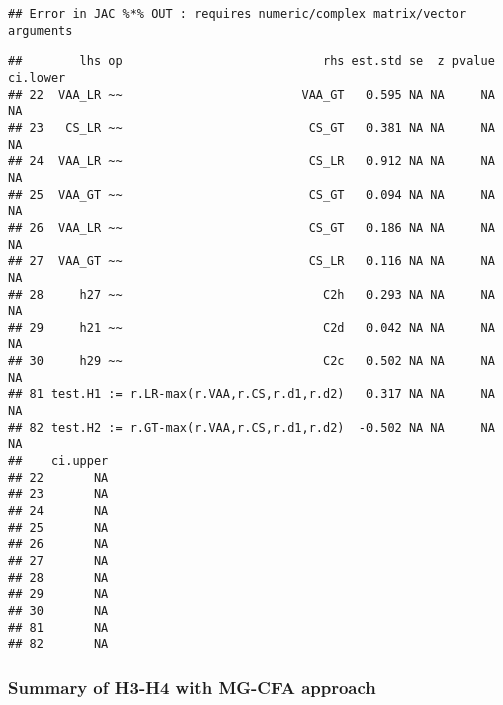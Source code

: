 \documentclass[
]{article}
\newenvironment{Shaded}{\begin{snugshade}}{\end{snugshade}}
\newcommand{\NormalTok}[1]{#1}
\newcommand{\OperatorTok}[1]{\textcolor[rgb]{0.81,0.36,0.00}{\textbf{#1}}}
\newcommand{\StringTok}[1]{\textcolor[rgb]{0.31,0.60,0.02}{#1}}
\begin{document}
\begin{verbatim}
## Error in JAC %*% OUT : requires numeric/complex matrix/vector arguments
\end{verbatim}

\begin{Shaded}
\end{Shaded}

\begin{verbatim}
##        lhs op                            rhs est.std se  z pvalue ci.lower
## 22  VAA_LR ~~                         VAA_GT   0.595 NA NA     NA       NA
## 23   CS_LR ~~                          CS_GT   0.381 NA NA     NA       NA
## 24  VAA_LR ~~                          CS_LR   0.912 NA NA     NA       NA
## 25  VAA_GT ~~                          CS_GT   0.094 NA NA     NA       NA
## 26  VAA_LR ~~                          CS_GT   0.186 NA NA     NA       NA
## 27  VAA_GT ~~                          CS_LR   0.116 NA NA     NA       NA
## 28     h27 ~~                            C2h   0.293 NA NA     NA       NA
## 29     h21 ~~                            C2d   0.042 NA NA     NA       NA
## 30     h29 ~~                            C2c   0.502 NA NA     NA       NA
## 81 test.H1 := r.LR-max(r.VAA,r.CS,r.d1,r.d2)   0.317 NA NA     NA       NA
## 82 test.H2 := r.GT-max(r.VAA,r.CS,r.d1,r.d2)  -0.502 NA NA     NA       NA
##    ci.upper
## 22       NA
## 23       NA
## 24       NA
## 25       NA
## 26       NA
## 27       NA
## 28       NA
## 29       NA
## 30       NA
## 81       NA
## 82       NA
\end{verbatim}

\newpage

\hypertarget{summary-of-h3-h4-with-mg-cfa-approach}{%
\subsubsection{Summary of H3-H4 with MG-CFA
approach}\label{summary-of-h3-h4-with-mg-cfa-approach}}
\end{document}
